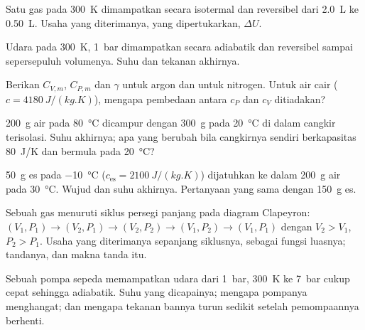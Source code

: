 \begin{exercise}[$\star$]\label{exo:b1:first-law:2}
Satu  gas pada \qty{300}{K} dimampatkan secara isotermal dan
reversibel dari \qty{2.0}{L} ke \qty{0.50}{L}. Usaha yang diterimanya, 
yang dipertukarkan, $\Delta U$.
\end{exercise}

\begin{exercise}[$\star$]\label{exo:b1:first-law:3}
Udara pada \qty{300}{K}, \qty{1}{bar} dimampatkan secara adiabatik dan
reversibel sampai sepersepuluh volumenya. Suhu dan tekanan akhirnya.
\end{exercise}

\begin{exercise}[$\star$]\label{exo:b1:first-law:4}
Berikan $C_{V,m}$, $C_{P,m}$ dan $\gamma$ untuk argon dan untuk nitrogen. Untuk
air cair ($c = \qty{4180}{J/(kg.K)}$), mengapa pembedaan antara
$c_P$ dan $c_V$ ditiadakan?
\end{exercise}

\begin{exercise}[$\star\star$]\label{exo:b1:first-law:5}
\qty{200}{g} air pada \qty{80}{\degreeCelsius} dicampur dengan \qty{300}{g}
pada \qty{20}{\degreeCelsius} di dalam cangkir terisolasi. Suhu akhirnya; apa
yang berubah bila cangkirnya sendiri berkapasitas  \qty{80}{J/K} dan bermula
pada \qty{20}{\degreeCelsius}?
\end{exercise}

\begin{exercise}[$\star\star$]\label{exo:b1:first-law:6}
\qty{50}{g} es pada \qty{-10}{\degreeCelsius} ($c_{\text{es}} = \qty{2100}{J/(kg.K)}$)
dijatuhkan ke dalam \qty{200}{g} air pada \qty{30}{\degreeCelsius}. Wujud dan suhu
akhirnya. Pertanyaan yang sama dengan \qty{150}{g} es.
\end{exercise}

\begin{exercise}[$\star\star$]\label{exo:b1:first-law:7}
Sebuah gas menuruti siklus persegi panjang pada diagram Clapeyron: $(V_1, P_1)
\to (V_2, P_1) \to (V_2, P_2) \to (V_1, P_2) \to (V_1, P_1)$ dengan $V_2 > V_1$,
$P_2 > P_1$. Usaha yang diterimanya sepanjang siklusnya, sebagai fungsi luasnya;
tandanya, dan makna tanda itu.
\end{exercise}

\begin{exercise}[$\star\star$]\label{exo:b1:first-law:8}
Sebuah pompa sepeda memampatkan udara dari \qty{1}{bar}, \qty{300}{K} ke
\qty{7}{bar} cukup cepat sehingga adiabatik. Suhu yang dicapainya; mengapa
pompanya menghangat; dan mengapa tekanan bannya turun sedikit setelah
pemompaannya berhenti.
\end{exercise}

